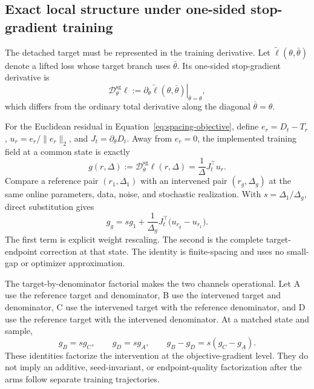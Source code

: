 \subsection{Exact local structure under one-sided stop-gradient training}
\label{sec:exact-local-structure}

The detached target must be represented in the training derivative.  Let
$\widetilde\ell(\theta,\bar\theta)$ denote a lifted loss whose target branch
uses $\bar\theta$.  Its one-sided stop-gradient derivative is
\begin{equation}
  \mathcal{D}^{\mathrm{sg}}_\theta\ell
  :=\left.\partial_\theta
  \widetilde\ell(\theta,\bar\theta)
  \right|_{\bar\theta=\theta},
  \label{eq:one-sided-sg-derivative}
\end{equation}
which differs from the ordinary total derivative along the diagonal
$\bar\theta=\theta$.

For the Euclidean residual in Equation~\eqref{eq:spacing-objective}, define
$e_r=D_t-T_r$, $u_r=e_r/\lVert e_r\rVert_2$, and
$J_t=\partial_\theta D_t$.  Away from $e_r=0$, the implemented training field
at a common state is exactly
\begin{equation}
  g(r,\Delta)
  :=\mathcal{D}^{\mathrm{sg}}_\theta\ell(r,\Delta)
  =\frac{1}{\Delta}J_t^\top u_r.
  \label{eq:one-sided-ect-field}
\end{equation}
Compare a reference pair $(r_1,\Delta_1)$ with an intervened pair
$(r_g,\Delta_g)$ at the same online parameters, data, noise, and stochastic
realization.  With $s=\Delta_1/\Delta_g$, direct substitution gives
\begin{equation}
  g_g
  =s g_1
   +\frac{1}{\Delta_g}J_t^\top
     \bigl(u_{r_g}-u_{r_1}\bigr).
  \label{eq:exact-local-composite}
\end{equation}
The first term is explicit weight rescaling.  The second is the complete
target-endpoint correction at that state.  The identity is finite-spacing and
uses no small-gap or optimizer approximation.

The target-by-denominator factorial makes the two channels operational.  Let
A use the reference target and denominator, B use the intervened target and
denominator, C use the intervened target with the reference denominator, and
D use the reference target with the intervened denominator.  At a matched
state and sample,
\begin{equation}
  g_B=s g_C,
  \qquad
  g_D=s g_A,
  \qquad
  g_B-g_D=s(g_C-g_A).
  \label{eq:exact-factorial-identities}
\end{equation}
These identities factorize the intervention at the objective-gradient level.
They do not imply an additive, seed-invariant, or endpoint-quality
factorization after the arms follow separate training trajectories.
